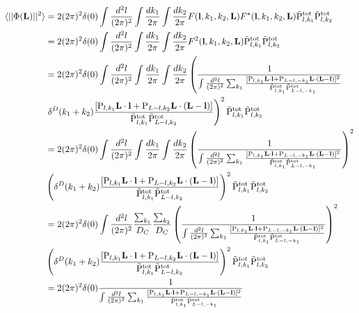 \documentclass[12pt]{article}
\newcommand{\beq}{\begin{equation}}
\newcommand{\eeq}{\end{equation}}
\newcommand{\beqal}{\begin{aligned}}
\newcommand{\eeqal}{\end{aligned}}
\def\l{{\bf l}}
\def\L{{\bf L}}
\def\pul{{\rm P}}
\def\ptot{{\tilde{\rm P}^{\rm tot}}}
\def\d2l{\frac{d^2l}{(2\pi)^2}}
\def\dko{\frac{dk_1}{2\pi}}
\def\dkt{\frac{dk_2}{2\pi}}
\numberwithin{equation}{section}
\begin{document}
\beq
\beqal
\langle ||\Phi(\L)||^2\rangle &= 2 (2\pi)^2 \delta(0) \int \d2l \int \dko \int
\dkt F(\l,k_1,k_2,\L) F^*(\l,k_1,k_2,\L) \ptot_{l,k_1}\ptot_{l,k_2} 
\\
&= 2 (2\pi)^2 \delta(0) \int \d2l \int \dko \int
\dkt F^2(\l,k_1,k_2,\L)\ptot_{l,k_1}\ptot_{l,k_2} 
\\
&= 2 (2\pi)^2 \delta(0)  \int \d2l \int \dko \int \dkt \left( \frac{1}{\int \frac{d^2 l}{(2\pi)^2} \sum_{k_1} \frac{[\pul_{l,k_1} \L\cdot \l +
		\pul_{L-l,-k_1} \L\cdot (\L-\l)]^2}{\ptot_{l,k_1}\ptot_{L-l,-k_1}} }   \right.
\\
& \left.	\delta^D(k_1+k_2) \frac{[\pul_{l,k_1} \L\cdot \l +
	\pul_{L-l,k_2} \L\cdot (\L-\l)]}{\ptot_{l,k_1}\ptot_{L-l,k_2}} \right)^2 \ptot_{l,k_1}\ptot_{l,k_2} 
\\
&=  2 (2\pi)^2\delta(0) \int \d2l \int \dko \int \dkt \left( \frac{1}{\int \frac{d^2 l}{(2\pi)^2} \sum_{k_1} \frac{[\pul_{l,k_1} \L\cdot \l +
		\pul_{L-l,-k_1} \L\cdot (\L-\l)]^2}{\ptot_{l,k_1}\ptot_{L-l,-k_1}} } \right)^2
\\
& \left(	\delta^D(k_1+k_2) \frac{[\pul_{l,k_1} \L\cdot \l +
	\pul_{L-l,k_2} \L\cdot (\L-\l)]}{\ptot_{l,k_1}\ptot_{L-l,k_2}} \right)^2 \ptot_{l,k_1}\ptot_{l,k_2} 
\\
&=  2 (2\pi)^2\delta(0) \int \d2l \frac{\sum_{k_1}}{D_C} \frac{\sum_{k_2}}{D_C} \left( \frac{1}{\int \frac{d^2 l}{(2\pi)^2} \sum_{k_1} \frac{[\pul_{l,k_1} \L\cdot \l +
		\pul_{L-l,-k_1} \L\cdot (\L-\l)]^2}{\ptot_{l,k_1}\ptot_{L-l,-k_1}} } \right)^2
\\
& \left(	\delta^D(k_1+k_2) \frac{[\pul_{l,k_1} \L\cdot \l +
	\pul_{L-l,k_2} \L\cdot (\L-\l)]}{\ptot_{l,k_1}\ptot_{L-l,k_2}} \right)^2 \ptot_{l,k_1}\ptot_{l,k_2} 
\\
	&=  2 (2\pi)^2\delta(0) \frac{1}{\int \frac{d^2 l}{(2\pi)^2} \sum_{k_1} \frac{[\pul_{l,k_1} \L\cdot \l +
		\pul_{L-l,-k_1} \L\cdot (\L-\l)]^2}{\ptot_{l,k_1}\ptot_{L-l,-k_1}} } 
\eeqal
\eeq
%
%
%
\end{document}
